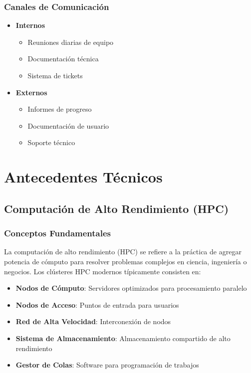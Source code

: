\subsection{Canales de Comunicación}
\begin{itemize}
    \item \textbf{Internos}
    \begin{itemize}
        \item Reuniones diarias de equipo
        \item Documentación técnica
        \item Sistema de tickets
    \end{itemize}
    \item \textbf{Externos}
    \begin{itemize}
        \item Informes de progreso
        \item Documentación de usuario
        \item Soporte técnico
    \end{itemize}
\end{itemize}

\chapter{Antecedentes Técnicos}
\section{Computación de Alto Rendimiento (HPC)}
\subsection{Conceptos Fundamentales}
La computación de alto rendimiento (HPC) se refiere a la práctica de agregar potencia de cómputo para resolver problemas complejos en ciencia, ingeniería o negocios. Los clústeres HPC modernos típicamente consisten en:

\begin{itemize}
    \item \textbf{Nodos de Cómputo}: Servidores optimizados para procesamiento paralelo
    \item \textbf{Nodos de Acceso}: Puntos de entrada para usuarios
    \item \textbf{Red de Alta Velocidad}: Interconexión de nodos
    \item \textbf{Sistema de Almacenamiento}: Almacenamiento compartido de alto rendimiento
    \item \textbf{Gestor de Colas}: Software para programación de trabajos
\end{itemize}

